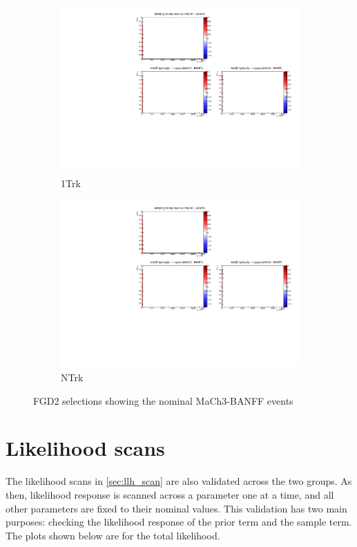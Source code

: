 \begin{figure}[h]
\begin{subfigure}[t]{0.24\textwidth}
		\includegraphics[width=\textwidth, trim={5mm 70mm 100mm 7mm}, clip, page=13]{figures/mach3/banff/momentumProjections_170328_withMACH3_MAQEonly}
		\caption{\numu 1Trk}
	\end{subfigure}
	\begin{subfigure}[t]{0.24\textwidth}
		\includegraphics[width=\textwidth, trim={5mm 70mm 100mm 7mm}, clip, page=14]{figures/mach3/banff/momentumProjections_170328_withMACH3_MAQEonly}
		\caption{\numu NTrk}
	\end{subfigure}
	\caption{FGD2 selections showing the nominal MaCh3-BANFF events}
	\label{fig:mach3_banff_prefit_fgd2}
\end{figure}

\section{Likelihood scans}
The likelihood scans in \autoref{sec:llh_scan} are also validated across the two groups. As then, likelihood response is scanned across a parameter one at a time, and all other parameters are fixed to their nominal values. This validation has two main purposes: checking the likelihood response of the prior term and the sample term. The plots shown below are for the total likelihood.

